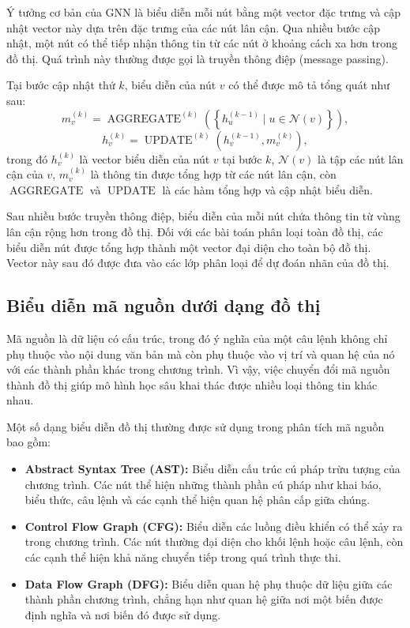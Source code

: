 Ý tưởng cơ bản của GNN là biểu diễn mỗi nút bằng một vector đặc trưng và cập nhật vector này dựa trên đặc trưng của các nút lân cận. Qua nhiều bước cập nhật, một nút có thể tiếp nhận thông tin từ các nút ở khoảng cách xa hơn trong đồ thị. Quá trình này thường được gọi là truyền thông điệp (message passing).

Tại bước cập nhật thứ $k$, biểu diễn của nút $v$ có thể được mô tả tổng quát như sau:
\[
	m_v^{(k)} =
	\operatorname{AGGREGATE}^{(k)}
	\left(
	\left\{
	h_u^{(k-1)} \mid u \in \mathcal{N}(v)
	\right\}
	\right),
\]
\[
	h_v^{(k)} =
	\operatorname{UPDATE}^{(k)}
	\left(
	h_v^{(k-1)}, m_v^{(k)}
	\right),
\]
trong đó $h_v^{(k)}$ là vector biểu diễn của nút $v$ tại bước $k$, $\mathcal{N}(v)$ là tập các nút
lân cận của $v$, $m_v^{(k)}$ là thông tin được tổng hợp từ các nút lân cận, còn
$\operatorname{AGGREGATE}$ và $\operatorname{UPDATE}$ là các hàm tổng hợp và cập nhật biểu diễn.

Sau nhiều bước truyền thông điệp, biểu diễn của mỗi nút chứa thông tin từ vùng lân cận rộng hơn
trong đồ thị. Đối với các bài toán phân loại toàn đồ thị, các biểu diễn nút được tổng hợp thành một
vector đại diện cho toàn bộ đồ thị. Vector này sau đó được đưa vào các lớp phân loại để dự đoán
nhãn của đồ thị.

\subsection{Biểu diễn mã nguồn dưới dạng đồ thị}

Mã nguồn là dữ liệu có cấu trúc, trong đó ý nghĩa của một câu lệnh không chỉ phụ thuộc vào nội dung
văn bản mà còn phụ thuộc vào vị trí và quan hệ của nó với các thành phần khác trong chương trình.
Vì vậy, việc chuyển đổi mã nguồn thành đồ thị giúp mô hình học sâu khai thác được nhiều loại thông
tin khác nhau.

Một số dạng biểu diễn đồ thị thường được sử dụng trong phân tích mã nguồn bao gồm:

\begin{itemize}
	\item \textbf{Abstract Syntax Tree (AST):} Biểu diễn cấu trúc cú pháp trừu tượng của chương trình. Các nút thể hiện những thành phần cú pháp như khai báo, biểu thức, câu lệnh và các cạnh thể hiện quan hệ phân cấp giữa chúng.
	\item \textbf{Control Flow Graph (CFG):} Biểu diễn các luồng điều khiển có thể xảy ra trong chương trình. Các nút thường đại diện cho khối lệnh hoặc câu lệnh, còn các cạnh thể hiện khả năng chuyển tiếp trong quá trình thực thi.
	\item \textbf{Data Flow Graph (DFG):} Biểu diễn quan hệ phụ thuộc dữ liệu giữa các thành phần chương trình, chẳng hạn như quan hệ giữa nơi một biến được định nghĩa và nơi biến đó được sử dụng.
\end{itemize}

